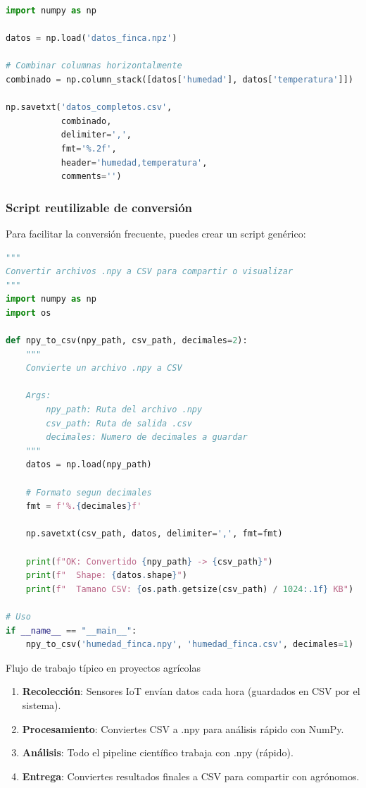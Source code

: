 \documentclass[11pt, a4paper]{article}
\begin{document}
\begin{lstlisting}[language=Python, caption={Combinar arrays en un solo CSV}]
import numpy as np

datos = np.load('datos_finca.npz')

# Combinar columnas horizontalmente
combinado = np.column_stack([datos['humedad'], datos['temperatura']])

np.savetxt('datos_completos.csv',
           combinado,
           delimiter=',',
           fmt='%.2f',
           header='humedad,temperatura',
           comments='')
\end{lstlisting}

\subsubsection{Script reutilizable de conversión}

Para facilitar la conversión frecuente, puedes crear un script genérico:

\begin{lstlisting}[language=Python, caption={Conversor .npy a CSV reutilizable}]
"""
Convertir archivos .npy a CSV para compartir o visualizar
"""
import numpy as np
import os

def npy_to_csv(npy_path, csv_path, decimales=2):
    """
    Convierte un archivo .npy a CSV

    Args:
        npy_path: Ruta del archivo .npy
        csv_path: Ruta de salida .csv
        decimales: Numero de decimales a guardar
    """
    datos = np.load(npy_path)

    # Formato segun decimales
    fmt = f'%.{decimales}f'

    np.savetxt(csv_path, datos, delimiter=',', fmt=fmt)

    print(f"OK: Convertido {npy_path} -> {csv_path}")
    print(f"  Shape: {datos.shape}")
    print(f"  Tamano CSV: {os.path.getsize(csv_path) / 1024:.1f} KB")

# Uso
if __name__ == "__main__":
    npy_to_csv('humedad_finca.npy', 'humedad_finca.csv', decimales=1)
\end{lstlisting}

\begin{agrobox}{Flujo de trabajo típico en proyectos agrícolas}
\begin{enumerate}
    \item \textbf{Recolección}: Sensores IoT envían datos cada hora (guardados en CSV por el sistema).
    \item \textbf{Procesamiento}: Conviertes CSV a .npy para análisis rápido con NumPy.
    \item \textbf{Análisis}: Todo el pipeline científico trabaja con .npy (rápido).
    \item \textbf{Entrega}: Conviertes resultados finales a CSV para compartir con agrónomos.
\end{enumerate}
\end{agrobox}
\end{document}
